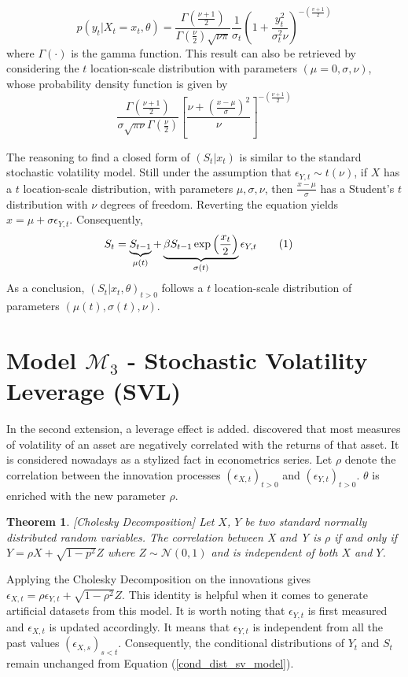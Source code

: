 \documentclass[11pt,a4,twosided,singlespacing,titlepagenumber=on]{scrreprt}
\numberwithin{equation}{chapter} %
\newtheorem{theorem}{Theorem}%
\theoremstyle{remark}
\newcommand\numberthis{\addtocounter{equation}{1}\tag{\theequation}}
\begin{document}
\begin{equation}
p(y_t | X_t = x_t, \theta) = \frac{\Gamma(\frac{\nu+1}{2})}{\Gamma(\frac{\nu}{2}) \sqrt{\nu\pi}} \frac{1}{\sigma_t}\left( 1 + \frac{y_t^2}{\sigma_t^2 \nu}\right)^{-\left(\frac{v+1}{2} \right)}
\end{equation}
where $\Gamma(\cdot)$ is the gamma function. This result can also be retrieved by considering the $t$ location-scale distribution with parameters $(\mu = 0, \sigma, \nu)$, whose probability density function is given by
\begin{equation}
\frac{\Gamma \left(\frac{\nu+1}{2} \right)}{\sigma \sqrt{\pi \nu} \Gamma \left(\frac{\nu}{2} \right)} \left[ \frac{\nu + \left( \frac{x-\mu}{\sigma}\right)^2}{\nu}\right]^{-\left(\frac{\nu+1}{2} \right)}
\end{equation}


The reasoning to find a closed form of $(S_t | x_t)$ is similar to the standard stochastic volatility model. Still under the assumption that $\epsilon_{Y,t} \sim t(\nu)$, if $X$ has a $t$ location-scale distribution, with parameters $\mu, \sigma, \nu$, then $\frac{x-\mu}{\sigma}$ has a Student's $t$ distribution with $\nu$ degrees of freedom. Reverting the equation yields $x = \mu + \sigma \epsilon_{Y,t}$. Consequently,
\begin{align*}
S_t  &= \underbrace{S_{t-1}}_{\mu(t)} + \underbrace{\beta S_{t-1} \exp \left( \frac{x_t}{2} \right)}_{\sigma(t)} \epsilon_{Y,t} \numberthis
\end{align*}
As a conclusion, $(S_t | x_t, \theta)_{t>0}$ follows a $t$ location-scale distribution of parameters $(\mu(t), \sigma(t), \nu)$.

\section{Model $\mathcal{M}_3$ - Stochastic Volatility Leverage (SVL)}
In the second extension, a leverage effect is added. \cite{black1976} discovered that most measures of volatility of an asset are negatively correlated with the returns of that asset. It is considered nowadays as a stylized fact in econometrics series. Let $\rho$ denote the correlation between the innovation processes $(\epsilon_{X,t})_{t>0}$ and $(\epsilon_{Y,t})_{t>0}$. $\theta$ is enriched with the new parameter $\rho$.

\begin{theorem}
\textit{
[Cholesky Decomposition] Let $X$, $Y$ be two standard normally distributed random variables. The correlation between X and Y is $\rho$ if and only if $Y = \rho X + \sqrt{1-p^2} Z$ where $Z \sim \mathcal{N}(0,1)$ and is independent of both $X$ and $Y$.
}
\end{theorem}
Applying the Cholesky Decomposition on the innovations gives $\epsilon_{X,t} = \rho \epsilon_{Y,t} + \sqrt{1-\rho^2} Z$. This identity is helpful when it comes to generate artificial datasets from this model. It is worth noting that $\epsilon_{Y,t}$ is first measured and $\epsilon_{X,t}$ is updated accordingly. It means that $\epsilon_{Y,t}$ is independent from all the past values $(\epsilon_{X,s})_{s < t}$. Consequently, the conditional distributions of $Y_t$ and $S_t$ remain unchanged from Equation (\ref{cond_dist_sv_model}).
\end{document}

